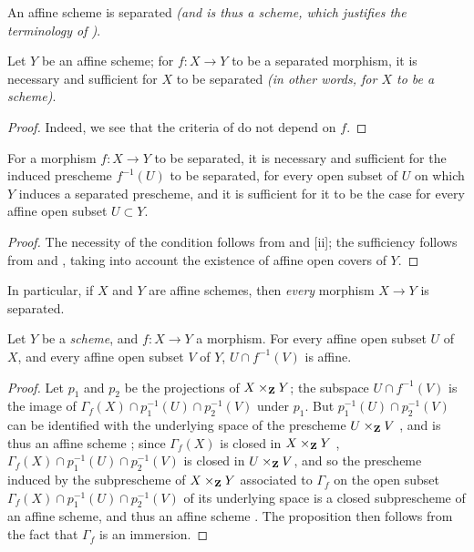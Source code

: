 \begin{corollary}[5.5.7]
\label{1.5.5.7}
An affine scheme is separated \emph{(and is thus a \emph{scheme}, which justifies the terminology of )}.
\end{corollary}

\begin{corollary}[5.5.8]
\label{1.5.5.8}
Let $Y$ be an affine scheme;
for $f:X\to Y$ to be a separated morphism, it is necessary and sufficient for $X$ to be separated \emph{(in other words, for $X$ to be a \emph{scheme})}.
\end{corollary}

\begin{proof}
\label{proof-1.5.5.8}
Indeed, we see that the criteria of  do not depend on $f$.
\end{proof}

\begin{corollary}[5.5.9]
\label{1.5.5.9}
For a morphism $f:X\to Y$ to be separated, it is necessary and sufficient for the induced prescheme $f^{-1}(U)$ to be separated, for every open subset of $U$ on which $Y$ induces a separated prescheme, and it is sufficient for it to be the case for every affine open subset $U\subset Y$.
\end{corollary}

\begin{proof}
\label{proof-1.5.5.9}
The necessity of the condition follows from  and [ii];
the sufficiency follows from  and , taking into account the existence of affine open covers of $Y$.
\end{proof}

In particular, if $X$ and $Y$ are affine schemes, then \emph{every} morphism $X\to Y$ is separated.

\begin{proposition}[5.5.10]
\label{1.5.5.10}
Let $Y$ be a \emph{scheme}, and $f:X\to Y$ a morphism.
For every affine open subset $U$ of $X$, and every affine open subset $V$ of $Y$, $U\cap f^{-1}(V)$ is affine.
\end{proposition}

\begin{proof}
\label{proof-1.5.5.10}
Let $p_1$ and $p_2$ be the projections of $X\times_\mathbf{Z} Y$;
the subspace $U\cap f^{-1}(V)$ is the image of $\Gamma_f(X)\cap p_1^{-1}(U)\cap p_2^{-1}(V)$ under $p_1$.
But $p_1^{-1}(U)\cap p_2^{-1}(V)$ can be identified with the underlying space of the
prescheme $U\times_\mathbf{Z} V$ , and is thus an affine scheme ;
since $\Gamma_f(X)$ is closed in $X\times_\mathbf{Z} Y$ , $\Gamma_f(X)\cap p_1^{-1}(U)\cap p_2^{-1}(V)$ is closed in $U\times_\mathbf{Z} V$, and so the prescheme induced by the subprescheme of $X\times_\mathbf{Z} Y$ associated to $\Gamma_f$  on the open subset $\Gamma_f(X)\cap p_1^{-1}(U)\cap p_2^{-1}(V)$ of its underlying space is a closed subprescheme of an affine scheme, and thus an affine scheme .
The proposition then follows from the fact that $\Gamma_f$ is an immersion.
\end{proof}

